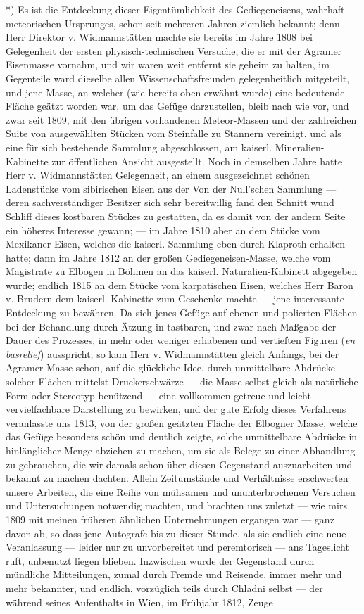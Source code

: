 \documentclass[a4paper, 11pt, oneside, german]{article}
\begin{document}
*) Es ist die Entdeckung dieser Eigentümlichkeit des Gediegeneisens, wahrhaft meteorischen Ursprunges, schon seit mehreren Jahren ziemlich bekannt; denn Herr Direktor v. Widmannstätten machte sie bereits im Jahre 1808 bei Gelegenheit der ersten physisch-technischen Versuche, die er mit der Agramer Eisenmasse vornahm, und wir waren weit entfernt sie geheim zu halten, im Gegenteile ward dieselbe allen Wissenschaftsfreunden gelegenheitlich mitgeteilt, und jene Masse, an welcher (wie bereits oben erwähnt wurde) eine bedeutende Fläche geätzt worden war, um das Gefüge darzustellen, bleib nach wie vor, und zwar seit 1809, mit den übrigen vorhandenen Meteor-Massen und der zahlreichen Suite von ausgewählten Stücken vom Steinfalle zu Stannern vereinigt, und als eine für sich bestehende Sammlung abgeschlossen, am kaiserl. Mineralien-Kabinette zur öffentlichen Ansicht ausgestellt. Noch in demselben Jahre hatte Herr v. Widmannstätten Gelegenheit, an einem ausgezeichnet schönen Ladenstücke vom sibirischen Eisen aus der Von der Null'schen Sammlung --- deren sachverständiger Besitzer sich sehr bereitwillig fand den Schnitt wund Schliff dieses kostbaren Stückes zu gestatten, da es damit von der andern Seite ein höheres Interesse gewann; --- im Jahre 1810 aber an dem Stücke vom Mexikaner Eisen, welches die kaiserl. Sammlung eben durch Klaproth erhalten hatte; dann im Jahre 1812 an der großen Gediegeneisen-Masse, welche vom Magistrate zu Elbogen in Böhmen an das kaiserl. Naturalien-Kabinett abgegeben wurde; endlich 1815 an dem Stücke vom karpatischen Eisen, welches Herr Baron v. Brudern dem kaiserl. Kabinette zum Geschenke machte --- jene interessante Entdeckung zu bewähren. Da sich jenes Gefüge auf ebenen und polierten Flächen bei der Behandlung durch Ätzung in tastbaren, und zwar nach Maßgabe der Dauer des Prozesses, in mehr oder weniger erhabenen und vertieften Figuren (\emph{en basrelief}) ausspricht; so kam Herr v. Widmannstätten gleich Anfangs, bei der Agramer Masse schon, auf die glückliche Idee, durch unmittelbare Abdrücke solcher Flächen mittelst Druckerschwärze --- die Masse selbst gleich als natürliche Form oder Stereotyp benützend --- eine vollkommen getreue und leicht vervielfachbare Darstellung zu bewirken, und der gute Erfolg dieses Verfahrens veranlasste uns 1813, von der großen geätzten Fläche der Elbogner Masse, welche das Gefüge besonders schön und deutlich zeigte, solche unmittelbare Abdrücke in hinlänglicher Menge abziehen zu machen, um sie als Belege zu einer Abhandlung zu gebrauchen, die wir damals schon über diesen Gegenstand auszuarbeiten und bekannt zu machen dachten. Allein Zeitumstände und Verhältnisse erschwerten unsere Arbeiten, die eine Reihe von mühsamen und ununterbrochenen Versuchen und Untersuchungen notwendig machten, und brachten uns zuletzt --- wie mirs 1809 mit meinen früheren ähnlichen Unternehmungen ergangen war --- ganz davon ab, so dass jene Autografe bis zu dieser Stunde, als sie endlich eine neue Veranlassung --- leider nur zu unvorbereitet und peremtorisch --- ans Tageslicht ruft, unbenutzt liegen blieben. Inzwischen wurde der Gegenstand durch mündliche Mitteilungen, zumal durch Fremde und Reisende, immer mehr und mehr bekannter, und endlich, vorzüglich teils durch Chladni selbst --- der während seines Aufenthalts in Wien, im Frühjahr 1812, Zeuge 
\end{document}
